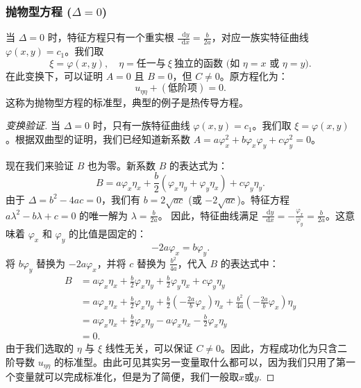 \documentclass[12pt,a4paper]{article}
\newcommand{\diff}{\mathop{}\!\mathrm{d}}
\numberwithin{subsection}{section}
\numberwithin{subsubsection}{subsection}
\theoremstyle{plain}
\theoremstyle{definition}
\theoremstyle{remark}
\begin{document}
	\subsubsection{抛物型方程 (\texorpdfstring{$\Delta = 0$}{Delta = 0})}
	当 \(\Delta = 0\) 时，特征方程只有一个重实根 \(\frac{\diff y}{\diff x} = \frac{b}{2a}\)，对应一族实特征曲线 \(\varphi(x,y)=c_1\)。我们取
	\[
	\xi = \varphi(x,y), \quad \eta = \text{任一与}\ \xi\ \text{独立的函数 (如 } \eta=x \text{ 或 } \eta=y).
	\]
	在此变换下，可以证明 \(A=0\) 且 \(B=0\)，但 \(C \neq 0\)。原方程化为：
	\begin{equation}\label{eq:parabolic_canonical}
		u_{\eta\eta} + (\text{低阶项}) = 0.
	\end{equation}
	这称为抛物型方程的标准型，典型的例子是热传导方程。
	
	\begin{proof}[变换验证]
		当 \(\Delta = 0\) 时，只有一族特征曲线 \(\varphi(x,y)=c_1\)。我们取 \(\xi = \varphi(x,y)\)。根据双曲型的证明，我们已经知道新系数 \(A = a\varphi_x^2 + b\varphi_x\varphi_y + c\varphi_y^2 = 0\)。
		
		现在我们来验证 \(B\) 也为零。新系数 \(B\) 的表达式为：
		\[
		B = a\varphi_x\eta_x + \frac{b}{2}(\varphi_x\eta_y + \varphi_y\eta_x) + c\varphi_y\eta_y.
		\]
		由于 \(\Delta = b^2 - 4ac = 0\)，我们有 \(b = 2\sqrt{ac}\) (或 \(-2\sqrt{ac}\))。特征方程 \(a\lambda^2 - b\lambda + c = 0\) 的唯一解为 \(\lambda = \frac{b}{2a}\)。
		因此，特征曲线满足 \(\frac{\diff y}{\diff x} = -\frac{\varphi_x}{\varphi_y} = \frac{b}{2a}\)。这意味着 \(\varphi_x\) 和 \(\varphi_y\) 的比值是固定的：
		\[
		-2a\varphi_x = b\varphi_y.
		\]
		将 \(b\varphi_y\) 替换为 \(-2a\varphi_x\)，并将 \(c\) 替换为 \(\frac{b^2}{4a}\)，代入 \(B\) 的表达式中：
		\begin{align*}
			B &= a\varphi_x\eta_x + \frac{b}{2}\varphi_x\eta_y + \frac{b}{2}\varphi_y\eta_x + c\varphi_y\eta_y \\
			&= a\varphi_x\eta_x + \frac{b}{2}\varphi_x\eta_y + \frac{b}{2}\left(-\frac{2a}{b}\varphi_x\right)\eta_x + \frac{b^2}{4a}\left(-\frac{2a}{b}\varphi_x\right)\eta_y \\
			&= a\varphi_x\eta_x + \frac{b}{2}\varphi_x\eta_y - a\varphi_x\eta_x - \frac{b}{2}\varphi_x\eta_y \\
			&= 0.
		\end{align*}
		由于我们选取的 \(\eta\) 与 \(\xi\) 线性无关，可以保证 \(C \neq 0\)。因此，方程成功化为只含二阶导数 \(u_{\eta\eta}\) 的标准型。由此可见其实另一变量取什么都可以，因为我们只用了第一个变量就可以完成标准化，但是为了简便，我们一般取$x$或$y$.
	\end{proof}
	
\end{document}
